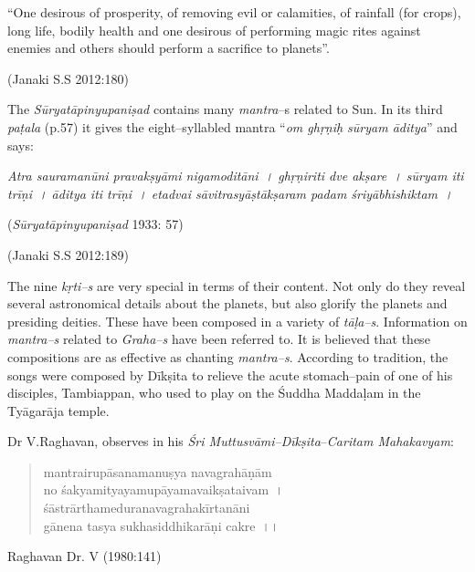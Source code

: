 \begin{myquote}
“One desirous of prosperity, of removing evil or calamities, of rainfall (for crops), long life, bodily health and one desirous of performing magic rites against enemies and others should perform a sacrifice to planets”.
\end{myquote}

\begin{flushright}
(Janaki S.S 2012:180)
\end{flushright}

The \textit{Sūryatāpinyupaniṣad} contains many \textit{mantra}–s related to Sun. In its third \textit{paṭala} (p.57) it gives the eight–syllabled mantra “\textit{om ghṛṇiḥ sūryam āditya}” and says:

\textit{Atra sauramanūni pravakṣyāmi nigamoditāni~। ghṛṇiriti dve akṣare~। sūryam iti trīṇi~। āditya iti trīṇi~। etadvai sāvitrasyāṣtākṣaram padam śriyābhishiktam~।}

\begin{flushright}
(\textit{Sūryatāpinyupaniṣad} 1933: 57)
\end{flushright}

\begin{flushright}
(Janaki S.S 2012:189)
\end{flushright}

The nine \textit{kṛti–s} are very special in terms of their content. Not only do they reveal several astronomical details about the planets, but also glorify the planets and presiding deities. These have been composed in a variety of \textit{tāḷa–s}. Information on \textit{mantra–s} related to \textit{Graha–s} have been referred to. It is believed that these compositions are as effective as chanting \textit{mantra–s}. According to tradition, the songs were composed by Dīkṣita to relieve the acute stomach–pain of one of his disciples, Tambiappan, who used to play on the Śuddha Maddaḷam in the Tyāgarāja temple.

Dr V.Raghavan, observes in his \textit{Śri Muttusvāmi–Dīkṣita}–\textit{Caritam Mahakavyam}:

\begin{verse}
mantrairupāsanamanuṣya navagrahāṇām\\ no śakyamityayamupāyamavaikṣataivam~।\\ śāstrārthameduranavagrahakīrtanāni\\ gānena tasya sukhasiddhikarāṇi cakre~।।
\end{verse}

\begin{flushright}
Raghavan Dr. V (1980:141)
\end{flushright}

